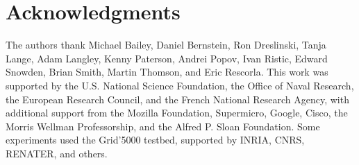 \section*{Acknowledgments}

The authors thank Michael Bailey, Daniel Bernstein, Ron Dreslinski,
Tanja Lange, Adam Langley, Kenny Paterson, Andrei Popov, Ivan Ristic,
Edward Snowden, Brian Smith, Martin Thomson, and Eric Rescorla.  This
work was supported by the U.S. National Science Foundation, the Office
of Naval Research, the European Research Council, and the French
National Research Agency, with additional support from the Mozilla
Foundation, Supermicro, Google, Cisco, the Morris Wellman
Professorship, and the Alfred P. Sloan Foundation.  Some experiments
used the Grid'5000 testbed, supported by INRIA, CNRS, RENATER, and
others.
